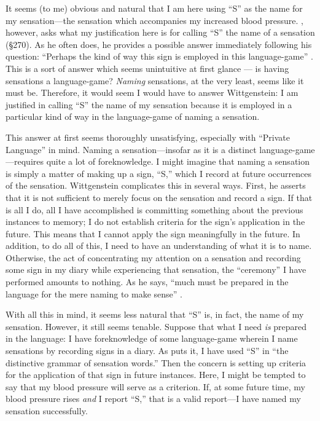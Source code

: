 \documentclass[doc,12pt,apacite,biblatex]{apa6}
\begin{document}
It seems (to me) obvious and natural that I am here using ``S'' as the name for
my sensation---the sensation which accompanies my increased blood pressure.
, however, asks what my justification here is for calling
``S'' the name of a sensation (\S 270). As he often does, he provides a
possible answer immediately following his question: ``Perhaps the kind of way
this sign is employed in this language-game'' .
This is a sort of answer which seems unintuitive at first glance --- is having
sensations a language-game? \emph{Naming} sensations, at the very least, seems
like it must be. Therefore, it would seem I would have to answer Wittgenstein:
I am justified in calling ``S'' the name of my sensation because it is employed
in a particular kind of way in the language-game of naming a sensation.

This answer at first seems thoroughly unsatisfying, especially with ``Private
Language'' in mind. Naming a sensation---insofar as it is a distinct
language-game---requires quite a lot of foreknowledge. I might imagine that
naming a sensation is simply a matter of making up a sign, ``S,'' which I
record at future occurrences of the sensation. Wittgenstein complicates this in
several ways. First, he asserts that it is not sufficient to merely focus on
the sensation and record a sign. If that is all I do, all I have accomplished
is committing something about the previous instances to memory; I do not
establish criteria for the sign's application in the future. This means that I
cannot apply the sign meaningfully in the future.  In addition, to do all of
this, I need to have an understanding of what it is to name. Otherwise, the act
of concentrating my attention on a sensation and recording some sign in my
diary while experiencing that sensation, the ``ceremony'' I have performed
amounts to nothing. As he says, ``much must be prepared in the language for the
mere naming to make sense'' \cite[\S 257]{Wittgenstein53}.

With all this in mind, it seems less natural that ``S'' is, in fact, the name
of my sensation. However, it still seems tenable. Suppose that what I need
\emph{is} prepared in the language: I have foreknowledge of some language-game
wherein I name sensations by recording signs in a diary. As 
puts it, I have used ``S'' in ``the distinctive grammar of sensation words.''
Then the concern is setting up criteria for the application of that sign in
future instances.  Here, I might be tempted to say that my blood pressure will
serve as a criterion. If, at some future time, my blood pressure rises
\emph{and} I report ``S,'' that is a valid report---I have named my sensation
successfully.
\end{document}
